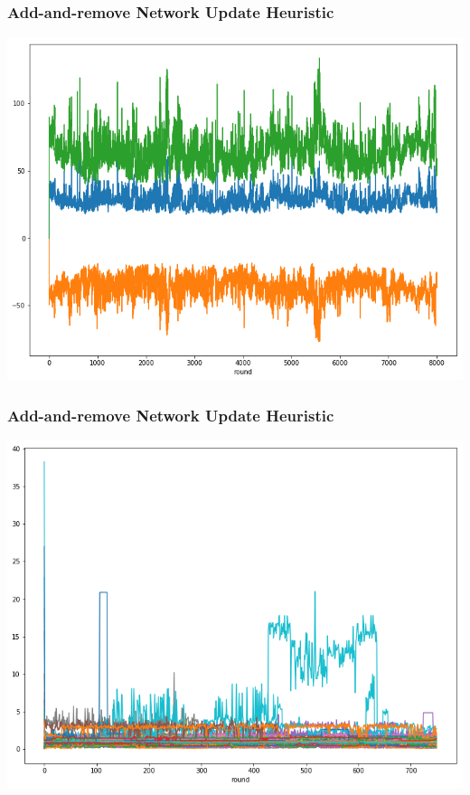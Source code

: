 \documentclass{beamer}
\begin{document}
\begin{frame}
  \frametitle{Add-and-remove Network Update Heuristic}
  \includegraphics[width=\textwidth]{h2allgap.png}
\end{frame}

\begin{frame}
  \frametitle{Add-and-remove Network Update Heuristic}
  \includegraphics[width=\textwidth]{h2prices.png}
\end{frame}
\end{document}
